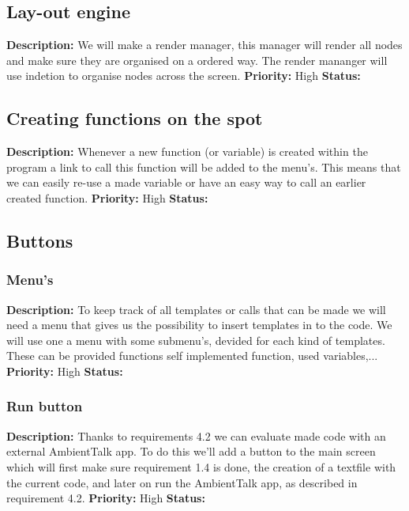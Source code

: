 \documentclass{article}
\begin{document}
\subsection{Lay-out engine}
\textbf{Description: } We will make a render manager, this manager will render all nodes and make sure they are organised on a ordered way. The render mananger will use
indetion to organise nodes across the screen.
\textbf{Priority:} High \newline
\textbf{Status: } \newline
\subsection{Creating functions on the spot}
\textbf{Description: } Whenever a new function (or variable) is created within the program a link to call this function will be added to the menu's. This means that we can
easily re-use a made variable or have an easy way to call an earlier created function. \newline
\textbf{Priority:} High \newline
\textbf{Status: } \newline
\subsection{Buttons}
\subsubsection{Menu's}
\textbf{Description: } To keep track of all templates or calls that can be made we will need a menu that gives us the possibility to insert templates in to the code.
We will use one a menu with some submenu's, devided for each kind of templates. These can be provided functions self implemented function, used variables,... \newline
\textbf{Priority:} High \newline
\textbf{Status: } \newline
\subsubsection{Run button}
\textbf{Description: } Thanks to requirements 4.2 we can evaluate made code with an external AmbientTalk app. To do this we'll add a button
to the main screen which will first make sure requirement 1.4 is done, the creation of a textfile with the current code, and later on run the AmbientTalk app, as described in requirement 4.2.
\textbf{Priority:} High \newline
\textbf{Status: } \newline
\end{document}
